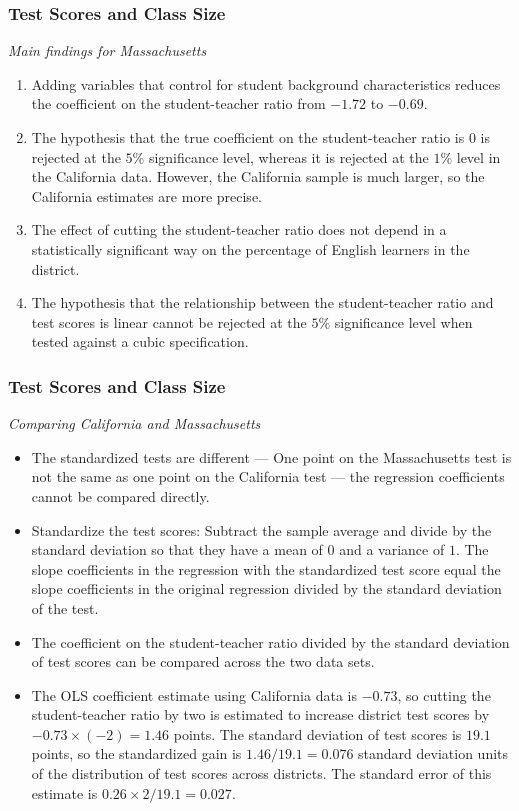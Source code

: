 \begin{frame}
\frametitle{Test Scores and Class Size}
\emph{Main findings for Massachusetts}
\begin{enumerate}
\item Adding variables that control for student background characteristics reduces the coefficient on the student-teacher ratio from $-1.72$ to $-0.69$. %
\item The hypothesis that the true coefficient on the student-teacher ratio is $0$ is rejected at the $5\%$ significance level, whereas it is rejected at the $1\%$ level in the California data.  However, the California sample is much larger, so the California estimates are more precise. 
\item The effect of cutting the student-teacher ratio does not depend in a statistically significant way on the percentage of English learners in the district.
\item The hypothesis that the relationship between the student-teacher ratio and test scores is linear cannot be rejected at the $5\%$ significance level when tested against a cubic specification.
\end{enumerate}
\end{frame}


\begin{frame}
\frametitle{Test Scores and Class Size}
\emph{Comparing California and Massachusetts}
\begin{itemize}
\item The standardized tests are different --- One point on the Massachusetts test is not the same as one point on the California test --- the regression coefficients cannot be compared directly. 
\item Standardize the test scores: Subtract the sample average and divide by the standard deviation so that they have a mean of $0$ and a variance of $1$. The slope coefficients in the regression with the standardized test score equal the slope coefficients in the original regression divided by the standard deviation of the test. 
\item The coefficient on the student-teacher ratio divided by the standard deviation of test scores can be compared across the two data sets.
\item The OLS coefficient estimate using California data is $-0.73$, so cutting the student-teacher ratio by two is estimated to increase district test scores by $-0.73 \times (-2) = 1.46$ points. The standard deviation of test scores is $19.1$ points, so the standardized gain is $1.46/19.1=0.076$ standard deviation units of the distribution of test scores across districts. The standard error of this estimate is $0.26 \times 2 / 19.1 = 0.027$. 
\end{itemize}
\end{frame}


